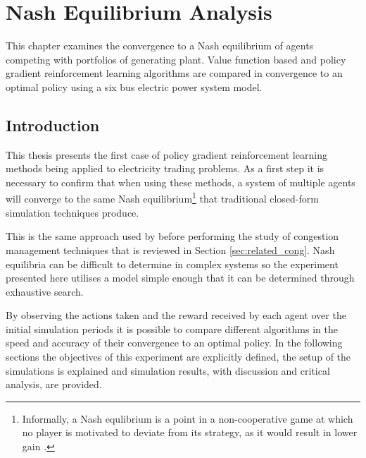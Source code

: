 \chapter{Nash Equilibrium Analysis}
\label{ch:nashanalysis}
This chapter examines the convergence to a Nash equilibrium of agents competing
with portfolios of generating plant.  Value function based and policy gradient
reinforcement learning algorithms are compared in convergence to an optimal
policy using a six bus electric power system model.

\section{Introduction}
This thesis presents the first case of
policy gradient reinforcement learning methods being applied to electricity
trading problems.  As a first step it is necessary to confirm that when using
these methods, a system of multiple agents will converge to the same Nash
equilibrium\footnote{Informally, a Nash equlibrium is a point in a
non-cooperative game at which no player is motivated to deviate from its
strategy, as it would result in lower gain \cite{nash50,nash51}.} that
traditional closed-form simulation techniques produce.

This is the same approach used by  before performing the
study of congestion management techniques that is reviewed in Section
\ref{sec:related_cong}.  Nash equilibria can be difficult
to determine in complex systems so the experiment presented here utilises a
model simple enough that it can be determined through exhaustive search.

By observing the actions taken and the reward received by each agent over the
initial simulation periods it is possible to compare different algorithms in
the speed and accuracy of their convergence to an optimal policy.  In the
following sections the objectives of this experiment are explicitly defined,
the setup of the simulations is explained and simulation results, with
discussion and critical analysis, are provided.

